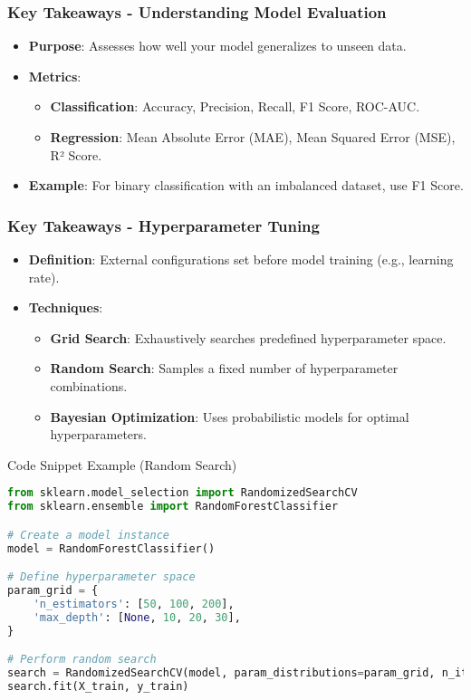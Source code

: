 \documentclass{beamer}
\begin{document}
\begin{frame}[fragile]
    \frametitle{Key Takeaways - Understanding Model Evaluation}
    
    \begin{itemize}
        \item \textbf{Purpose}: Assesses how well your model generalizes to unseen data.
        \item \textbf{Metrics}:
        \begin{itemize}
            \item \textbf{Classification}: Accuracy, Precision, Recall, F1 Score, ROC-AUC.
            \item \textbf{Regression}: Mean Absolute Error (MAE), Mean Squared Error (MSE), R² Score.
        \end{itemize}
        \item \textbf{Example}: For binary classification with an imbalanced dataset, use F1 Score.
    \end{itemize}

\end{frame}

\begin{frame}[fragile]
    \frametitle{Key Takeaways - Hyperparameter Tuning}
    
    \begin{itemize}
        \item \textbf{Definition}: External configurations set before model training (e.g., learning rate).
        \item \textbf{Techniques}:
        \begin{itemize}
            \item \textbf{Grid Search}: Exhaustively searches predefined hyperparameter space.
            \item \textbf{Random Search}: Samples a fixed number of hyperparameter combinations.
            \item \textbf{Bayesian Optimization}: Uses probabilistic models for optimal hyperparameters.
        \end{itemize}
    \end{itemize}
    
    \begin{block}{Code Snippet Example (Random Search)}
        \begin{lstlisting}[language=Python]
from sklearn.model_selection import RandomizedSearchCV
from sklearn.ensemble import RandomForestClassifier

# Create a model instance
model = RandomForestClassifier()

# Define hyperparameter space
param_grid = {
    'n_estimators': [50, 100, 200],
    'max_depth': [None, 10, 20, 30],
}

# Perform random search
search = RandomizedSearchCV(model, param_distributions=param_grid, n_iter=10)
search.fit(X_train, y_train)
        \end{lstlisting}
    \end{block}

\end{frame}
\end{document}

